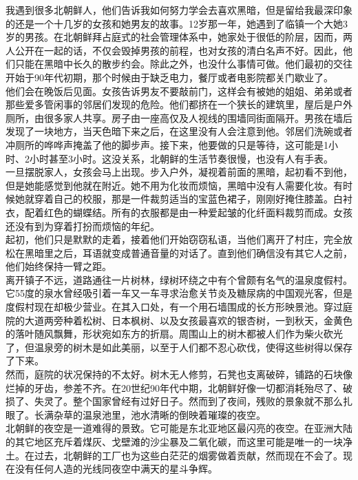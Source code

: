\begin{multicols}{\theparacolNo}
我遇到很多北朝鲜人，他们告诉我如何努力学会去喜欢黑暗，但是留给我最深印象的还是一个十几岁的女孩和她男友的故事。12岁那一年，她遇到了临镇一个大她3岁的男孩。在北朝鲜拜占庭式的社会管理体系中，她家处于很低的阶层，因而，两人公开在一起的话，不仅会毁掉男孩的前程，也对女孩的清白名声不好。因此，他们只能在黑暗中长久的散步约会。除此之外，也没什么事情可做。他们最初的交往开始于90年代初期，那个时候由于缺乏电力，餐厅或者电影院都关门歇业了。\\

他们会在晚饭后见面。女孩告诉男友不要敲前门，这样会有被她的姐姐、弟弟或者那些爱多管闲事的邻居们发现的危险。他们都挤在一个狭长的建筑里，屋后是户外厕所，由很多家人共享。房子由一座高仅及人视线的围墙同街面隔开。男孩在墙后发现了一块地方，当天色暗下来之后，在这里没有人会注意到他。邻居们洗碗或者冲厕所的哗哗声掩盖了他的脚步声。接下来，他要做的只是等待，这可能是1小时、2小时甚至3小时。这没关系，北朝鲜的生活节奏很慢，也没有人有手表。\\

一旦摆脱家人，女孩会马上出现。步入户外，凝视着前面的黑暗，起初看不到他，但是她能感觉到他就在附近。她不用为化妆而烦恼，黑暗中没有人需要化妆。有时候她就穿着自己的校服，那是一件裁剪适当的宝蓝色裙子，刚刚好掩住膝盖。白衬衣，配着红色的蝴蝶结。所有的衣服都是由一种爱起皱的化纤面料裁剪而成。女孩还没有到为穿着打扮而烦恼的年纪。\\

起初，他们只是默默的走着，接着他们开始窃窃私语，当他们离开了村庄，完全放松在黑暗里之后，耳语就变成普通音量的对话了。直到他们确信没有其它人之前，他们始终保持一臂之距。\\

离开镇子不远，道路通往一片树林，绿树环绕之中有个曾颇有名气的温泉度假村。它55度的泉水曾经吸引着一车又一车寻求治愈关节炎及糖尿病的中国观光客，但是度假村现在却极少营业。在其入口处，有一个用石墙围成的长方形映景池。穿过庭院的大道两旁种着松树、日本枫树、以及女孩最喜欢的银杏树，一到秋天，金黄色的落叶随风飘舞，形状宛如东方的折扇。周围山上的树木都被人们作为柴火砍光了，但温泉旁的树木是如此美丽，以至于人们都不忍心砍伐，使得这些树得以保存了下来。\\

然而，庭院的状况保持的不太好。树木无人修剪，石凳也支离破碎，铺路的石块像烂掉的牙齿，参差不齐。在20世纪90年代中期，北朝鲜好像一切都消耗殆尽了、破损了、失灵了。整个国家曾经有过好日子。然而到了夜间，残败的景象就不那么扎眼了。长满杂草的温泉池里，池水清晰的倒映着璀璨的夜空。\\

北朝鲜的夜空是一道难得的景致。它可能是东北亚地区最闪亮的夜空。在亚洲大陆的其它地区充斥着煤灰、戈壁滩的沙尘暴及二氧化碳，而这里可能是唯一的一块净土。在过去，北朝鲜的工厂也为这些白茫茫的烟雾做着贡献，然而现在不会了。现在没有任何人造的光线同夜空中满天的星斗争辉。\\


\end{multicols}
